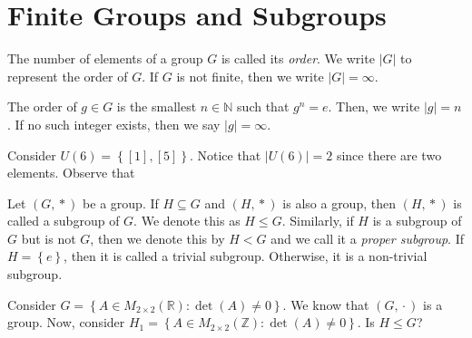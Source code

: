 \chapter{Finite Groups and Subgroups}

\begin{definition}
    The number of elements of a group \(G\) is called its \textit{order}. We write \(|G|\) to represent the order of \(G\). If \(G\) is not finite, then we write \(|G| = \infty\).
\end{definition}

\begin{definition}
    The order of \(g \in G\) is the smallest \(n \in \mathbb{N}\) such that \(g^n = e\). Then, we write \(|g| = n\). If no such integer exists, then we say \(|g| = \infty\).
\end{definition}

\begin{nexample}
    Consider \(U(6) = \left\{[1], [5]\right\}\). Notice that \(|U(6)| = 2\) since there are two elements. Observe that 
\end{nexample}

\begin{definition}[Subgroup]
    Let \((G, {}*{})\) be a group. If \(H \subseteq G\) and \((H, {}*{})\) is also a group, then \((H, {}*{})\) is called a subgroup of \(G\). We denote this as \(H \leq G\). Similarly, if \(H\) is a subgroup of \(G\) but is not \(G\), then we denote this by \(H < G\) and we call it a \textit{proper subgroup}. If \(H = \left\{e\right\}\), then it is called a trivial subgroup. Otherwise, it is a non-trivial subgroup.
\end{definition}

\begin{nexample}
    Consider \(G = \left\{A \in M_{2 \times 2}(\mathbb{R}) : \det(A) \neq 0\right\}\). We know that \((G, {}\cdot{})\) is a group. Now, consider \(H_1 = \left\{A \in M_{2 \times 2}(\mathbb{Z}) : \det(A) \neq 0\right\}\). Is \(H \leq G\)?
\end{nexample}
